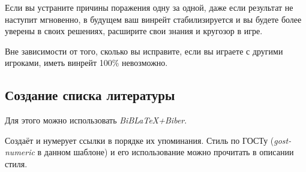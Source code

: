 Если вы устраните причины поражения одну за одной, даже если результат не наступит мгновенно, в будущем ваш винрейт стабилизируется и вы будете более уверены в своих решениях, расширите свои знания и кругозор в игре.

Вне зависимости от того, сколько вы исправите, если вы играете с другими игроками, иметь винрейт 100\% невозможно.

\subsection{Создание списка литературы}

Для этого можно использовать \emph{BiBLaTeX+Biber}.\cite{biblatex}

Создаёт и нумерует ссылки в порядке их упоминания.\cite{modelcheck} Стиль по ГОСТу (\emph{gost-numeric} в данном шаблоне) и его использование можно прочитать в описании стиля.\cite{gost}
